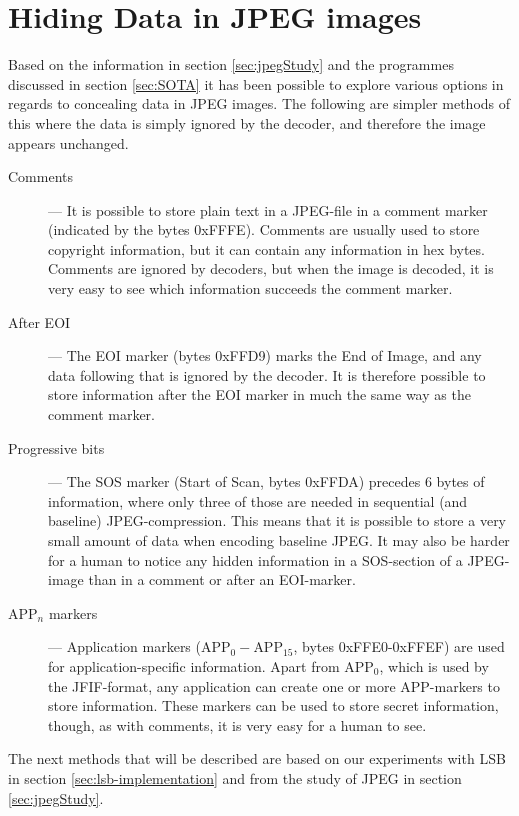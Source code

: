 
\section{Hiding Data in JPEG images}

Based on the information in section \ref{sec:jpegStudy} and the programmes discussed in section \ref{sec:SOTA} it has been possible to explore various options in regards to concealing data in JPEG images. The following are simpler methods of this where the data is simply ignored by the decoder, and therefore the image appears unchanged.

\begin{description}
	\item[Comments] ---
	It is possible to store plain text in a JPEG-file in a comment marker (indicated by the bytes 0xFFFE).
	Comments are usually used to store copyright information, but it can contain any information in hex bytes.
	Comments are ignored by decoders, but when the image is decoded, it is very easy to see which information succeeds the comment marker.

	\item[After EOI] ---
	The EOI marker (bytes 0xFFD9) marks the End of Image, and any data following that is ignored by the decoder.
	It is therefore possible to store information after the EOI marker in much the same way as the comment marker.

	\item[Progressive bits]	---
	The SOS marker (Start of Scan, bytes 0xFFDA) precedes 6 bytes of information, where only three of those are needed in sequential (and baseline) JPEG-compression.
	This means that it is possible to store a very small amount of data when encoding baseline JPEG.
	It may also be harder for a human to notice any hidden information in a SOS-section of a JPEG-image than in a comment or after an EOI-marker.

	\item[APP$_n$ markers] ---
	Application markers (APP$_0-$APP$_{15}$, bytes 0xFFE0-0xFFEF) are used for application-specific information.
	Apart from APP$_0$, which is used by the JFIF-format, any application can create one or more APP-markers to store information.
	These markers can be used to store secret information, though, as with comments, it is very easy for a human to see.
\end{description}

\noindent The next methods that will be described are based on our experiments with LSB in section \ref{sec:lsb-implementation} and from the study of JPEG in section \ref{sec:jpegStudy}.

